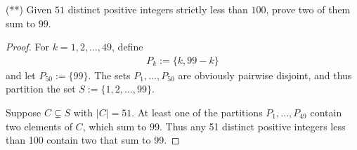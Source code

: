\documentclass[12pt]{article}
\begin{document}
\begin{problem}
(**) Given $51$ distinct positive integers strictly less than $100$, prove two of them sum to $99$.

\begin{proof}
For $k = 1,2,\ldots,49$, define 
\begin{align*}
    P_k := \{k, 99-k\}
\end{align*}
and let $P_{50} := \{99\}$. The sets $P_1, \ldots, P_{50}$ are obviously pairwise disjoint, and thus partition the set $S := \{1,2,\ldots,99\}$.

Suppose $C \subsetneq S$ with $|C| = 51$. At least one of the partitions $P_1,\ldots,P_{49}$ contain two elements of $C$, which sum to $99$. Thus any 51 distinct positive integers less than 100 contain two that sum to 99.
\end{proof}
\end{problem}
\end{document}
